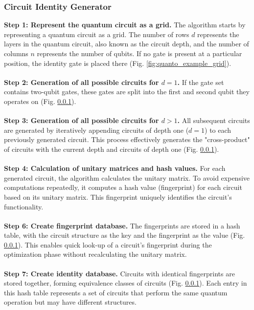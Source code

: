 \subsubsection{Circuit Identity Generator}
\textbf{Step 1: Represent the quantum circuit as a grid.}
The algorithm starts by representing a quantum circuit as a grid. The number of rows $d$ represents the layers in the quantum circuit, also known as the circuit depth, and the number of columns $n$ represents the number of qubits. If no gate is present at a particular position, the identity gate is placed there (Fig. \ref{fig:quanto_example_grid}).
\\\\
\textbf{Step 2: Generation of all possible circuits for $d = 1$.}
If the gate set contains two-qubit gates, these gates are split into the first and second qubit they operates on (Fig. \ref{}).
\\\\
\textbf{Step 3: Generation of all possible circuits for $d > 1$.}
All subsequent circuits are generated by iteratively appending circuits of depth one ($d=1$) to each previously generated circuit. This process effectively generates the "cross-product" of circuits with the current depth and circuits of depth one (Fig. \ref{}).
\\\\
\textbf{Step 4: Calculation of unitary matrices and hash values.}
For each generated circuit, the algorithm calculates the unitary matrix. To avoid expensive computations repeatedly, it computes a hash value (fingerprint) for each circuit based on its unitary matrix. This fingerprint uniquely identifies the circuit's functionality.
\\\\
\textbf{Step 6: Create fingerprint database.}
The fingerprints are stored in a hash table, with the circuit structure as the key and the fingerprint as the value (Fig. \ref{}). This enables quick look-up of a circuit’s fingerprint during the optimization phase without recalculating the unitary matrix.
\\\\
\textbf{Step 7: Create identity database.}
Circuits with identical fingerprints are stored together, forming equivalence classes of circuits (Fig. \ref{}). Each entry in this hash table represents a set of circuits that perform the same quantum operation but may have different structures.
\\\\

